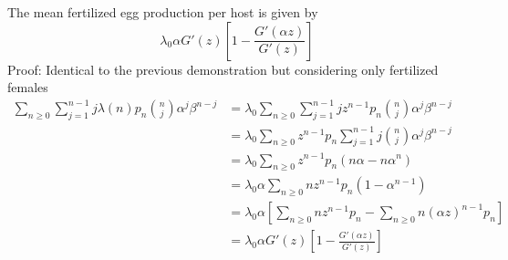 \documentclass[useAMS,referee,usenatbib]{biom}
\begin{document}
	The mean fertilized egg production per host is given by
	\begin{equation}\label{prodhuevosfecun}
	\lambda_0\alpha G'(z)\left[1-\frac{G'(\alpha z)}{G'(z)} \right]
	\end{equation}
		Proof: Identical to the previous demonstration but considering only fertilized females
		\begin{equation*}
		\begin{split}
		\sum_{n\geq 0}\sum_{j=1}^{n-1}j\lambda(n)p_n\binom{n}{j}\alpha^j\beta^{n-j}
		&=\lambda_0\sum_{n\geq 0}\sum_{j=1}^{n-1}jz^{n-1}p_n\binom{n}{j}\alpha^j\beta^{n-j}\\
		&=\lambda_0\sum_{n\geq 0}z^{n-1}p_n\sum_{j=1}^{n-1} j\binom{n}{j}\alpha^j\beta^{n-j}\\
		&=\lambda_0\sum_{n\geq 0}z^{n-1}p_n(n\alpha-n\alpha^n)\\
		&=\lambda_0\alpha\sum_{n\geq 0}nz^{n-1}p_n(1-\alpha^{n-1})\\
		&=\lambda_0\alpha \left[ \sum_{n\geq 0}nz^{n-1}p_n-\sum_{n\geq 0}n(\alpha z)^{n-1}p_n\right] \\
		&=\lambda_0\alpha G'(z)\left[1-\frac{G'(\alpha z)}{G'(z)} \right] 
		\end{split}
		\end{equation*}
\end{document}
